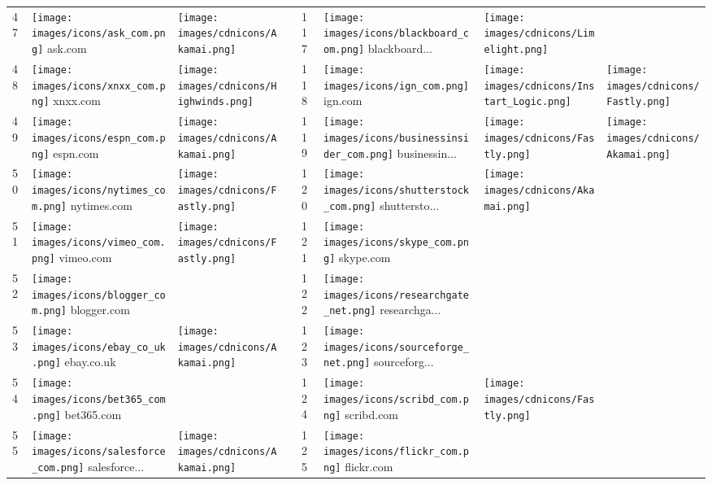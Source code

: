 \begin{table}[tbp]
\begin{tabular}{|llll|llll|}
47 & \texttt{[image: images/icons/ask\_com.png]} ask.com & \texttt{[image: images/cdnicons/Akamai.png]} & & 117 & \texttt{[image: images/icons/blackboard\_com.png]} blackboard... & \texttt{[image: images/cdnicons/Limelight.png]} & \\
48 & \texttt{[image: images/icons/xnxx\_com.png]} xnxx.com & \texttt{[image: images/cdnicons/Highwinds.png]} & & 118 & \texttt{[image: images/icons/ign\_com.png]} ign.com & \texttt{[image: images/cdnicons/Instart\_Logic.png]} & \texttt{[image: images/cdnicons/Fastly.png]} \\
49 & \texttt{[image: images/icons/espn\_com.png]} espn.com & \texttt{[image: images/cdnicons/Akamai.png]} & & 119 & \texttt{[image: images/icons/businessinsider\_com.png]} businessin... & \texttt{[image: images/cdnicons/Fastly.png]} & \texttt{[image: images/cdnicons/Akamai.png]} \\
50 & \texttt{[image: images/icons/nytimes\_com.png]} nytimes.com & \texttt{[image: images/cdnicons/Fastly.png]} & & 120 & \texttt{[image: images/icons/shutterstock\_com.png]} shuttersto... & \texttt{[image: images/cdnicons/Akamai.png]} & \\
51 & \texttt{[image: images/icons/vimeo\_com.png]} vimeo.com & \texttt{[image: images/cdnicons/Fastly.png]} & & 121 & \texttt{[image: images/icons/skype\_com.png]} skype.com & & \\
52 & \texttt{[image: images/icons/blogger\_com.png]} blogger.com & & & 122 & \texttt{[image: images/icons/researchgate\_net.png]} researchga... & & \\
53 & \texttt{[image: images/icons/ebay\_co\_uk.png]} ebay.co.uk & \texttt{[image: images/cdnicons/Akamai.png]} & & 123 & \texttt{[image: images/icons/sourceforge\_net.png]} sourceforg... & & \\
54 & \texttt{[image: images/icons/bet365\_com.png]} bet365.com & & & 124 & \texttt{[image: images/icons/scribd\_com.png]} scribd.com & \texttt{[image: images/cdnicons/Fastly.png]} & \\
55 & \texttt{[image: images/icons/salesforce\_com.png]} salesforce... & \texttt{[image: images/cdnicons/Akamai.png]} & & 125 & \texttt{[image: images/icons/flickr\_com.png]} flickr.com & & \\

\end{tabular}
\end{table}
